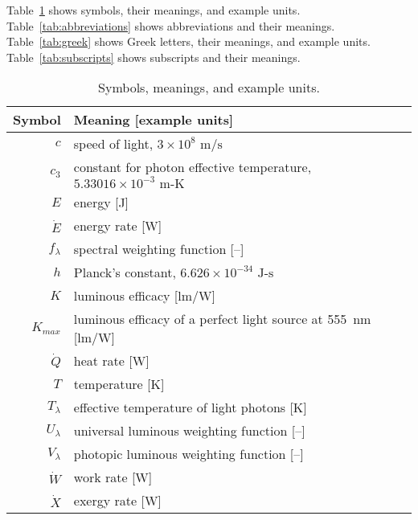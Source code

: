 
\noindent 
Table~\ref{tab:symbols} shows symbols, their meanings, and example units.
Table~\ref{tab:abbreviations} shows abbreviations and their meanings.
Table~\ref{tab:greek} shows Greek letters, their meanings, and example units.
Table~\ref{tab:subscripts} shows subscripts and their meanings.


  
\begin{table}
\centering %
\caption{Symbols, meanings, and example units.}
\begin{tabular}{r l}
\toprule
Symbol & Meaning [example units] \\
\midrule
$c$ & speed of light, $3 \times 10^8 \text{ m/s}$ \\
$c_3$ & constant for photon effective temperature, $5.33016 \times 10^{-3} \text{ m-K}$ \\
$E$ & energy [J] \\
$\dot{E}$ & energy rate [W] \\
$f_\lambda$ & spectral weighting function [--] \\
$h$ & Planck's constant, $6.626 \times 10^{-34} \text{ J-s}$ \\
$K$ & luminous efficacy [lm/W] \\
$K_{max}$ & luminous efficacy of a perfect light source at 555~nm [lm/W] \\
$\dot{Q}$ & heat rate [W] \\
$T$ & temperature [K] \\
$T_\lambda$ & effective temperature of light photons [K] \\
$U_\lambda$ & universal luminous weighting function [--] \\
$V_\lambda$ & photopic luminous weighting function [--] \\
$\dot{W}$ & work rate [W] \\
$\dot{X}$ & exergy rate [W] \\
\bottomrule
\end{tabular}
\label{tab:symbols}
\end{table}


  
